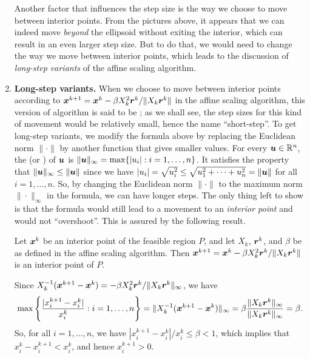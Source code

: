 \begin{enumerate}
\begin{center}
\end{center}
Another factor that influences the step size is the way we choose to move
between interior points.  From the pictures above, it appears that we can
indeed move \emph{beyond} the ellipsoid without exiting the interior, which can result
in an even larger step size. But to do that, we would need to change the way we
move between interior points, which leads to the discussion of \emph{long-step
variants} of the affine scaling algorithm.
\item \textbf{Long-step variants.} When we choose to move between interior
points according to \(\bm{x}^{k+1}=\bm{x}^{k}-\beta
X_k^{2}\bm{r}^{k}/\|X_k\bm{r}^{k}\|\) in the affine scaling algorithm, this
version of algorithm is said to be ; as we shall see, the step
sizes for this kind of movement would be relatively small, hence the name
``short-step''. To get long-step variants, we modify the formula above by
replacing the Euclidean norm \(\|\cdot\|\) by another function that gives
smaller values. For every \(\bm{u}\in\mathbb{R}^{n}\), the  (or
) of \(\bm{u}\) is
\(\|\bm{u}\|_{\infty}=\max\{|u_i|:i=1,\dotsc,n\}\). It satisfies the property
that \(\|\bm{u}\|_{\infty}\le\|\bm{u}\|\) since we have
\(|u_i|=\sqrt{u_i^{2}}\le\sqrt{u_1^{2}+\dotsb+u_n^{2}}=\|\bm{u}\|\) for all
\(i=1,\dotsc,n\). So, by changing the Euclidean norm \(\|\cdot\|\) to the
maximum norm \(\|\cdot\|_{\infty}\) in the formula, we can have longer steps.
The only thing left to show is that the formula would still lead to a movement
to an \emph{interior point} and would not “overshoot”.  This is assured by the
following result.
\begin{proposition}
\label{prp:max-norm-movement-interior}
Let \(\bm{x}^{k}\) be an interior point of the feasible region \(P\), and let
\(X_k\), \(\bm{r}^{k}\), and \(\beta\) be as defined in the affine scaling
algorithm. Then \(\bm{x}^{k+1}=\bm{x}^{k}-\beta
X_k^{2}\bm{r}^{k}/\|X_k\bm{r}^{k}\|\) is an interior point of \(P\).
\end{proposition}
\begin{pf}
Since \(X_k^{-1}(\bm{x}^{k+1}-\bm{x}^{k})=-\beta
X_k^{2}\bm{r}^{k}/\|X_k\bm{r}^{k}\|_{\infty}\), we have
\[
\max\left\{\frac{|x_i^{k+1}-x_i^{k}|}{x_i^{k}}:i=1,\dotsc,n\right\}
=\|X_k^{-1}(\bm{x}^{k+1}-\bm{x}^{k})\|_{\infty}
=\beta\frac{\|X_k\bm{r}^{k}\|_{\infty}}{\|X_k\bm{r}^{k}\|_{\infty}}
=\beta.
\]
So, for all \(i=1,\dotsc,n\), we have \(|x_i^{k+1}-x_i^{k}|/x_i^{k}\le\beta<1\),
which implies that \(x_i^{k}-x_{i}^{k+1}<x_i^{k}\), and hence \(x_i^{k+1}>0\).


\end{pf}
\end{enumerate}
